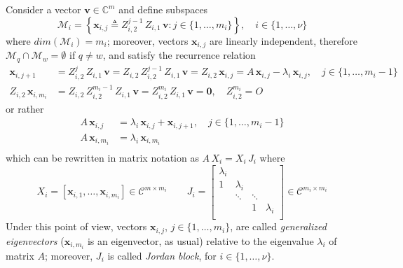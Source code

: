 
Consider a vector $\boldsymbol{v}\in\mathbb{C}^{m}$ and define subspaces
\begin{displaymath}
\mathcal{M}_{i} = \left\lbrace \boldsymbol{x}_{i,j} \triangleq Z_{i,2}^{j-1}\,Z_{i,1}\,\boldsymbol{v}: j\in\lbrace1,\ldots,m_{i}\rbrace\right\rbrace, \quad i\in \lbrace 1,\ldots,\nu \rbrace
\end{displaymath}
where $dim(\mathcal{M}_{i})=m_{i}$; moreover, vectors $\boldsymbol{x}_{i,j}$ are
linearly independent, therefore $\mathcal{M}_{q}\cap\mathcal{M}_{w}=\emptyset$
if $q\neq w$, and satisfy the recurrence relation
\begin{displaymath}
\begin{split}
\boldsymbol{x}_{i,j+1} &= Z_{i,2}^{j}\,Z_{i,1}\,\boldsymbol{v} = Z_{i,2}\,Z_{i,2}^{j-1}\,Z_{i,1}\,\boldsymbol{v} =  Z_{i,2}\,\boldsymbol{x}_{i,j}=A\,\boldsymbol{x}_{i,j} - \lambda_{i}\,\boldsymbol{x}_{i,j}, \quad j\in \lbrace 1,\ldots,m_{i}-1 \rbrace  \\
Z_{i,2}\,\boldsymbol{x}_{i,m_{i}} &=  Z_{i,2}\,Z_{i,2}^{m_{i}-1}\,Z_{i,1}\,\boldsymbol{v} = Z_{i,2}^{m_{i}}\,Z_{i,1}\,\boldsymbol{v} = \boldsymbol{0},\quad Z_{i,2}^{m_{i}}=O
\end{split}
\end{displaymath}
or rather
\begin{displaymath}
\begin{split}
A\,\boldsymbol{x}_{i,j} &= \lambda_{i}\,\boldsymbol{x}_{i,j} + \boldsymbol{x}_{i,j+1} , \quad j\in \lbrace 1,\ldots,m_{i}-1 \rbrace  \\
A\,\boldsymbol{x}_{i,m_{i}} &= \lambda_{i}\,\boldsymbol{x}_{i,m_{i}} \\
\end{split}
\end{displaymath}
which can be rewritten in matrix notation as $A\,X_{i} = X_{i}\,J_{i}$ where
\begin{displaymath}
X_{i} = \left[\boldsymbol{x}_{i,1},\ldots,\boldsymbol{x}_{i,m_{i}} \right]\in\mathcal{C}^{m\times m_{i}} \quad\quad
J_{i} = \left[ \begin{array}{cccc}
    \lambda_{i} \\
    1 & \lambda_{i} \\
      & \ddots & \ddots \\
      & & 1 &\lambda_{i} \\
\end{array} \right] \in\mathcal{C}^{m_{i}\times m_{i}}
\end{displaymath}
Under this point of view, vectors $\boldsymbol{x}_{i,j}$, $j\in \lbrace
1,\ldots,m_{i} \rbrace$, are called \textit{generalized eigenvectors}
($\boldsymbol{x}_{i,m_{i}}$ is an eigenvector, as usual) relative
to the eigenvalue $\lambda_{i}$ of matrix $A$; moreover, $J_{i}$ is called
\textit{Jordan block}, for $i\in \lbrace 1,\ldots,\nu \rbrace$. 

